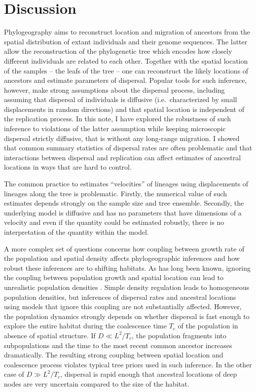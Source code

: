 \documentclass[aps,rmp, twocolumn]{revtex4}
\begin{document}
\section*{Discussion}
Phylogeography aims to reconstruct location and migration of ancestors from the spatial distribution of extant individuals and their genome sequences.
The latter allow the reconstruction of the phylogenetic tree which encodes how closely different individuals are related to each other.
Together with the spatial location of the samples -- the leafs of the tree -- one can reconstruct the likely locations of ancestors and estimate parameters of dispersal.
Popular tools for such inference, however, make strong assumptions about the dispersal process, including assuming that dispersal of individuals is diffusive (i.e.~characterized by small displacements in random directions) and that spatial location is independent of the replication process.
In this note, I have explored the robustness of such inference to violations of the latter assumption while keeping microscopic dispersal strictly diffusive, that is without any long-range migration.
I showed that common summary statistics of dispersal rates are often problematic and that interactions between dispersal and replication can affect estimates of ancestral locations in ways that are hard to control.

The common practice to estimates ``velocities'' of lineages using displacements of lineages along the tree \citep{dellicour_relax_2021} is problematic.
Firstly, the numerical value of such estimates depends strongly on the sample size and tree ensemble.
Secondly, the underlying model is diffusive and has no parameters that have dimensions of a velocity and even if the quantity could be estimated robustly, there is no interpretation of the quantity within the model.

A more complex set of questions concerns how coupling between growth rate of the population and spatial density affects phylogeographic inferences and how robust these inferences are to shifting habitats.
As has long been known, ignoring the coupling between population growth and spatial location can lead to unrealistic population densities \citep{felsenstein_pain_1975}.
Simple density regulation leads to homogeneous population densities, but inferences of dispersal rates and ancestral locations using models that ignore this coupling are not substantially affected.
However, the population dynamics strongly depends on whether dispersal is fast enough to explore the entire habitat during the coalescence time $T_c$ of the population in absence of spatial structure.
If $D\ll L^2/T_c$, the population fragments into subpopulations and the time to the most recent common ancestor increases dramatically.
The resulting strong coupling between spatial location and coalescence process violates typical tree priors used in such inference.
In the other case of $D\gg L^2/T_c$, dispersal is rapid enough that ancestral locations of deep nodes are very uncertain compared to the size of the habitat.
\end{document}
